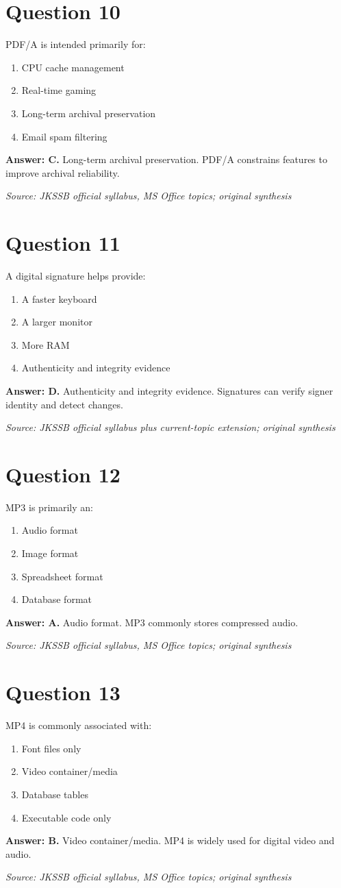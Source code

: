 \documentclass[11pt,a4paper]{book}
\newcommand{\source}[1]{\par\smallskip\textit{Source: #1}}
\newcommand{\answer}[2]{\par\textbf{Answer: #1.} #2}
\begin{document}
\section*{Question 10}
PDF/A is intended primarily for:
\begin{enumerate}[label=\Alph*.]
\item CPU cache management
\item Real-time gaming
\item Long-term archival preservation
\item Email spam filtering
\end{enumerate}
\answer{C}{Long-term archival preservation. PDF/A constrains features to improve archival reliability.}
\source{JKSSB official syllabus, MS Office topics; original synthesis}
\section*{Question 11}
A digital signature helps provide:
\begin{enumerate}[label=\Alph*.]
\item A faster keyboard
\item A larger monitor
\item More RAM
\item Authenticity and integrity evidence
\end{enumerate}
\answer{D}{Authenticity and integrity evidence. Signatures can verify signer identity and detect changes.}
\source{JKSSB official syllabus plus current-topic extension; original synthesis}
\section*{Question 12}
MP3 is primarily an:
\begin{enumerate}[label=\Alph*.]
\item Audio format
\item Image format
\item Spreadsheet format
\item Database format
\end{enumerate}
\answer{A}{Audio format. MP3 commonly stores compressed audio.}
\source{JKSSB official syllabus, MS Office topics; original synthesis}
\section*{Question 13}
MP4 is commonly associated with:
\begin{enumerate}[label=\Alph*.]
\item Font files only
\item Video container/media
\item Database tables
\item Executable code only
\end{enumerate}
\answer{B}{Video container/media. MP4 is widely used for digital video and audio.}
\source{JKSSB official syllabus, MS Office topics; original synthesis}
\end{document}
